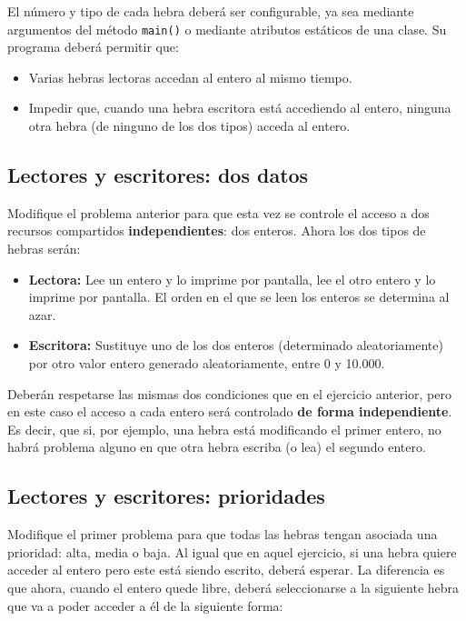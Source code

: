 \documentclass[a4paper]{article}
\newcommand{\code}[1]{\texttt{#1}}
\begin{document}
El número y tipo de cada hebra deberá ser configurable, ya sea mediante argumentos del método \code{main()} o mediante atributos estáticos de una clase. Su programa deberá permitir que:

\begin{itemize}
    \item Varias hebras lectoras accedan al entero al mismo tiempo.
    \item Impedir que, cuando una hebra escritora está accediendo al entero, ninguna otra hebra (de ninguno de los dos tipos) acceda al entero.
\end{itemize}

\subsection{Lectores y escritores: dos datos}

Modifique el problema anterior para que esta vez se controle el acceso a dos recursos compartidos \textbf{independientes}: dos enteros. Ahora los dos tipos de hebras serán:

\begin{itemize}
    \item \textbf{Lectora:} Lee un entero y lo imprime por pantalla, lee el otro entero y lo imprime por pantalla. El orden en el que se leen los enteros se determina al azar.
    \item \textbf{Escritora:} Sustituye uno de los dos enteros (determinado aleatoriamente) por otro valor entero generado aleatoriamente, entre 0 y 10.000.
\end{itemize}

Deberán respetarse las mismas dos condiciones que en el ejercicio anterior, pero en este caso el acceso a cada entero será controlado \textbf{de forma independiente}. Es decir, que si, por ejemplo, una hebra está modificando el primer entero, no habrá problema alguno en que otra hebra escriba (o lea) el segundo entero.

\subsection{Lectores y escritores: prioridades}

Modifique el primer problema para que todas las hebras tengan asociada una prioridad: alta, media o baja. Al igual que en aquel ejercicio, si una hebra quiere acceder al entero pero este está siendo escrito, deberá esperar. La diferencia es que ahora, cuando el entero quede libre, deberá seleccionarse a la siguiente hebra que va a poder acceder a él de la siguiente forma:
\end{document}
